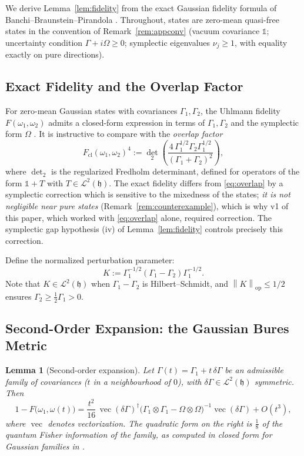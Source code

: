\documentclass[11pt,a4paper]{article}
\newcommand{\idm}{\mathds{1}}}{\newcommand{\idm}{\mathbf{1}}}
\theoremstyle{plain}
\newtheorem{lemma}[theorem]{Lemma}
\theoremstyle{definition}
\theoremstyle{remark}
\newcommand{\hh}{\mathfrak{h}}
\newcommand{\opnorm}[1]{\left\lVert #1 \right\rVert_{\mathrm{op}}}
\newcommand{\vc}{\operatorname{vec}}
\begin{document}
We derive Lemma~\ref{lem:fidelity} from the exact Gaussian fidelity formula of
Banchi--Braunstein--Pirandola \cite{BanchiBP15}. Throughout, states are zero-mean
quasi-free states in the convention of Remark~\ref{rem:appconv} (vacuum covariance
$\idm$; uncertainty condition $\Gamma + i\Omega \ge 0$; symplectic
eigenvalues $\nu_j \ge 1$, with equality exactly on pure directions).

\subsection{Exact Fidelity and the Overlap Factor}

For zero-mean Gaussian states with covariances $\Gamma_1, \Gamma_2$, the Uhlmann
fidelity $F(\omega_1,\omega_2)$ admits a closed-form expression in terms of
$\Gamma_1, \Gamma_2$ and the symplectic form $\Omega$ \cite{BanchiBP15}. It is
instructive to compare with the \emph{overlap factor}
\begin{equation}\label{eq:overlap}
F_{\mathrm{cl}}(\omega_1,\omega_2)^4 :=
{\det}_2\!\left(\frac{4\,\Gamma_1^{1/2}\Gamma_2\Gamma_1^{1/2}}
{(\Gamma_1 + \Gamma_2)^2}\right),
\end{equation}
where $\det_2$ is the regularized Fredholm determinant, defined for operators of
the form $\idm + T$ with $T \in \mathcal{L}^2(\hh)$. The exact fidelity
differs from \eqref{eq:overlap} by a symplectic correction which is sensitive to
the mixedness of the states; \emph{it is not negligible near pure states}
(Remark~\ref{rem:counterexample}), which is why v1 of this paper, which worked with
\eqref{eq:overlap} alone, required correction. The symplectic gap hypothesis (iv)
of Lemma~\ref{lem:fidelity} controls precisely this correction.

Define the normalized perturbation parameter:
\begin{equation}
K := \Gamma_1^{-1/2}(\Gamma_1 - \Gamma_2)\Gamma_1^{-1/2}.
\end{equation}
Note that $K \in \mathcal{L}^2(\hh)$ when $\Gamma_1 - \Gamma_2$ is Hilbert--Schmidt,
and $\opnorm{K} \le 1/2$ ensures $\Gamma_2 \ge \tfrac{1}{2}\Gamma_1 > 0$.

\subsection{Second-Order Expansion: the Gaussian Bures Metric}

\begin{lemma}[Second-order expansion]\label{lem:bures}
Let $\Gamma(t) = \Gamma_1 + t\,\delta\Gamma$ be an admissible family of covariances
($t$ in a neighbourhood of $0$), with $\delta\Gamma \in \mathcal{L}^2(\hh)$
symmetric. Then
\begin{equation}\label{eq:buresexp}
1 - F\big(\omega_1, \omega(t)\big)
= \frac{t^2}{16}\,\vc(\delta\Gamma)^{\dagger}
\big(\Gamma_1 \otimes \Gamma_1 - \Omega \otimes \Omega\big)^{-1}
\vc(\delta\Gamma) + O(t^3),
\end{equation}
where $\vc$ denotes vectorization. The quadratic form on the right is
$\tfrac{1}{8}$ of the quantum Fisher information of the family, as computed in
closed form for Gaussian families in \cite{BanchiBP15}.
\end{lemma}
\end{document}
